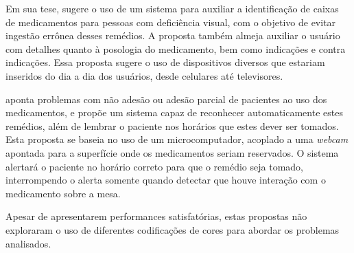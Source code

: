 Em sua tese, \citeauthor{benjamim2012identificaccao} \cite{benjamim2012identificaccao} sugere o uso de um sistema para auxiliar a identificação de caixas de medicamentos para pessoas com deficiência visual, com o objetivo de evitar ingestão errônea desses remédios.
A proposta também almeja auxiliar o usuário com detalhes quanto à posologia do medicamento, bem como indicações e contra indicações.
Essa proposta sugere o uso de dispositivos diversos que estariam inseridos do dia a dia dos usuários, desde celulares até televisores.

\citeauthor{rodrigues2022sisamed} \cite{rodrigues2022sisamed} aponta problemas com não adesão ou adesão parcial de pacientes ao uso dos medicamentos, e propõe um sistema capaz de reconhecer automaticamente estes remédios, além de lembrar o paciente nos horários que estes dever ser tomados.
Esta proposta se baseia no uso de um microcomputador, acoplado a uma \textit{webcam} apontada para a superfície onde os medicamentos seriam reservados.
O sistema alertará o paciente no horário correto para que o remédio seja tomado, interrompendo o alerta somente quando detectar que houve interação com o medicamento sobre a mesa.

Apesar de apresentarem performances satisfatórias, estas propostas não exploraram o uso de diferentes codificações de cores para abordar os problemas analisados.
